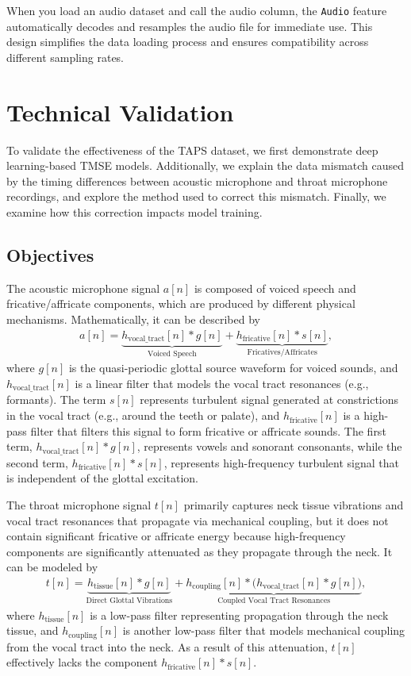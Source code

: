 \documentclass[10pt]{wlscirep}
\begin{document}
When you load an audio dataset and call the audio column, the \texttt{Audio} feature automatically decodes and resamples the audio file for immediate use. This design simplifies the data loading process and ensures compatibility across different sampling rates.

\section*{Technical Validation}
To validate the effectiveness of the TAPS dataset, we first demonstrate deep learning-based TMSE models. Additionally, we explain the data mismatch caused by the timing differences between acoustic microphone and throat microphone recordings, and explore the method used to correct this mismatch. Finally, we examine how this correction impacts model training.

\subsection*{Objectives}
The acoustic microphone signal \(a[n]\) is composed of voiced speech and fricative/affricate components, which are produced by different physical mechanisms. Mathematically, it can be described by
\begin{align}
    a[n] = \underbrace{h_{\text{vocal\_tract}}[n] \ast g[n]}_{\text{Voiced Speech}} 
       + \underbrace{h_{\text{fricative}}[n] \ast s[n]}_{\text{Fricatives/Affricates}},
\end{align}
where \(g[n]\) is the quasi-periodic glottal source waveform for voiced sounds, and \(h_{\text{vocal\_tract}}[n]\) is a linear filter that models the vocal tract resonances (e.g., formants). The term \(s[n]\) represents turbulent signal generated at constrictions in the vocal tract (e.g., around the teeth or palate), and \(h_{\text{fricative}}[n]\) is a high-pass filter that filters this signal to form fricative or affricate sounds. The first term, \(h_{\text{vocal\_tract}}[n] \ast g[n]\), represents vowels and sonorant consonants, while the second term, \(h_{\text{fricative}}[n] \ast s[n]\), represents high-frequency turbulent signal that is independent of the glottal excitation.

The throat microphone signal \(t[n]\) primarily captures neck tissue vibrations and vocal tract resonances that propagate via mechanical coupling, but it does not contain significant fricative or affricate energy because high-frequency components are significantly attenuated as they propagate through the neck. It can be modeled by  
\begin{align}
    t[n] = \underbrace{h_{\text{tissue}}[n] \ast g[n]}_{\text{Direct Glottal Vibrations}} 
       + \underbrace{h_{\text{coupling}}[n] \ast 
         \bigl(h_{\text{vocal\_tract}}[n] \ast g[n]\bigr)}_{\text{Coupled Vocal Tract Resonances}},
\end{align}
where \(h_{\text{tissue}}[n]\) is a low-pass filter representing propagation through the neck tissue, and \(h_{\text{coupling}}[n]\) is another low-pass filter that models mechanical coupling from the vocal tract into the neck. As a result of this attenuation, \(t[n]\) effectively lacks the component \(h_{\text{fricative}}[n] \ast s[n]\).
\end{document}

